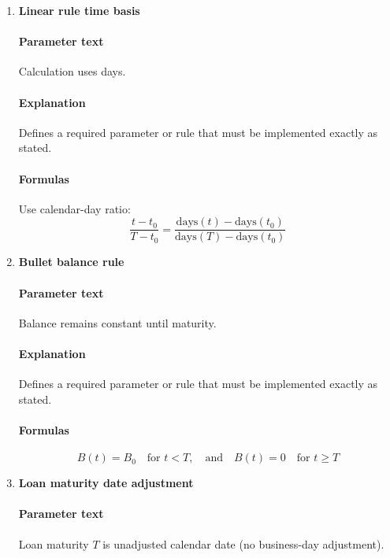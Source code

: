 \documentclass[11pt]{article}
\begin{document}
\begin{enumerate}[label=\arabic*),leftmargin=*,align=left]
\paragraph{Explanation} Specifies how exposure-at-default evolves over time.
\paragraph{Formulas} For as-of balance $B_0$, as-of date $t_0$, maturity $T$:
\[ B(t) = B_0 \times \max\left(0, 1 - \frac{t - t_0}{T - t_0}\right) \]

\item \textbf{Linear rule time basis}
\paragraph{Parameter text} Calculation uses days.
\paragraph{Explanation} Defines a required parameter or rule that must be implemented exactly as stated.
\paragraph{Formulas} Use calendar-day ratio:
\[ \frac{t - t_0}{T - t_0} = \frac{\text{days}(t)-\text{days}(t_0)}{\text{days}(T)-\text{days}(t_0)} \]

\item \textbf{Bullet balance rule}
\paragraph{Parameter text} Balance remains constant until maturity.
\paragraph{Explanation} Defines a required parameter or rule that must be implemented exactly as stated.
\paragraph{Formulas} 
\[ B(t) = B_0 \quad \text{for } t < T, \quad \text{and} \quad B(t)=0 \quad \text{for } t \ge T \]

\item \textbf{Loan maturity date adjustment}
\paragraph{Parameter text} Loan maturity $T$ is unadjusted calendar date (no business-day adjustment).

\end{enumerate}
\end{document}
